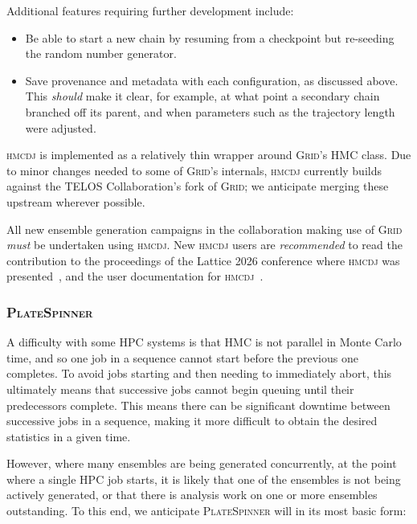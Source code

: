 \documentclass{article}
\newcommand\rfcword[1]{\emph{#1}\xspace}
\newcommand\must{\rfcword{must}}
\newcommand\should{\rfcword{should}}
\newcommand\recommended{\rfcword{recommended}}
\newcommand\program[1]{\textsc{#1}\xspace}
\begin{document}
Additional features requiring further development include:
\begin{itemize}
  \item
        Be able to start a new chain by resuming from a checkpoint
        but re-seeding the random number generator.
  \item
        Save provenance and metadata with each configuration,
        as discussed above.
        This \should make it clear,
        for example,
        at what point a secondary chain branched off its parent,
        and when parameters such as the trajectory length were adjusted.
\end{itemize}

\program{hmcdj} is implemented as
a relatively thin wrapper around \program{Grid}'s HMC class.
Due to minor changes needed to some of \program{Grid}'s internals,
\program{hmcdj} currently builds against
the TELOS Collaboration's fork of \program{Grid};
we anticipate merging these upstream wherever possible.

All new ensemble generation campaigns in the collaboration making use of \program{Grid}
\must be undertaken using \program{hmcdj}.
New \program{hmcdj} users are \recommended to read
the contribution to the proceedings of
the Lattice 2026 conference
where \program{hmcdj} was presented~\cite{hmcdj-proceedings},
and the user documentation for \program{hmcdj}~\cite{hmcdj-doc}.

\subsubsection{\program{PlateSpinner}}

A difficulty with some HPC systems is that
HMC is not parallel in Monte Carlo time,
and so one job in a sequence cannot start before the previous one completes.
To avoid jobs starting and then needing to immediately abort,
this ultimately means that successive jobs cannot begin queuing until
their predecessors complete.
This means there can be significant downtime between successive jobs in a sequence,
making it more difficult to obtain the desired statistics in a given time.

However,
where many ensembles are being generated concurrently,
at the point where a single HPC job starts,
it is likely that one of the ensembles is not being actively generated,
or that there is analysis work on one or more ensembles outstanding.
To this end,
we anticipate \program{PlateSpinner} will in its most basic form:
\end{document}
